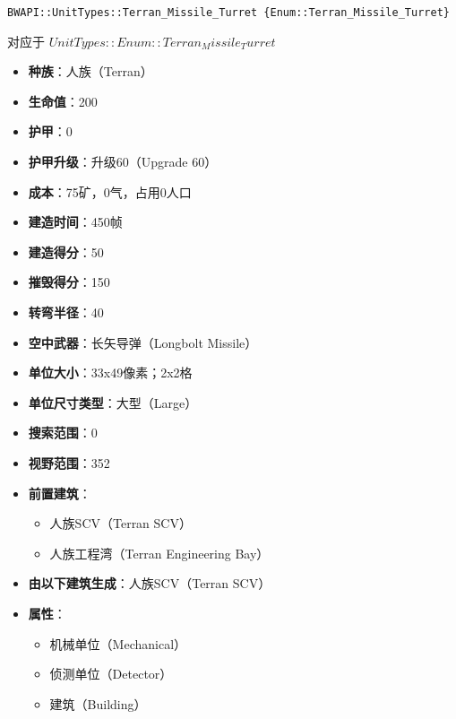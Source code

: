 \begin{tcolorbox}[colback=white, colframe=black!60!white, title=Terran\_Missile\_Turret(), arc=0mm]
    \begin{verbatim}
BWAPI::UnitTypes::Terran_Missile_Turret {Enum::Terran_Missile_Turret}
    \end{verbatim}
    对应于  $ UnitTypes::Enum::Terran_Missile_Turret $ 
    \begin{itemize}
        \item \textbf{种族}：人族（Terran）
        \item \textbf{生命值}：200
        \item \textbf{护甲}：0
        \item \textbf{护甲升级}：升级60（Upgrade 60）
        \item \textbf{成本}：75矿，0气，占用0人口
        \item \textbf{建造时间}：450帧
        \item \textbf{建造得分}：50
        \item \textbf{摧毁得分}：150
        \item \textbf{转弯半径}：40
        \item \textbf{空中武器}：长矢导弹（Longbolt Missile）
        \item \textbf{单位大小}：33x49像素；2x2格
        \item \textbf{单位尺寸类型}：大型（Large）
        \item \textbf{搜索范围}：0
        \item \textbf{视野范围}：352
        \item \textbf{前置建筑}：
            \begin{itemize}
                \item 人族SCV（Terran SCV）
                \item 人族工程湾（Terran Engineering Bay）
            \end{itemize}
        \item \textbf{由以下建筑生成}：人族SCV（Terran SCV）
        \item \textbf{属性}：
            \begin{itemize}
                \item 机械单位（Mechanical）
                \item 侦测单位（Detector）
                \item 建筑（Building）
            \end{itemize}
    \end{itemize}
\end{tcolorbox}

